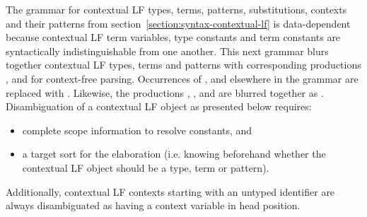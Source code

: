 \documentclass[11pt]{article}
\newcommand{\LF}{\textsc{LF}\xspace}
\begin{document}
The grammar for contextual \LF types, terms, patterns, substitutions, contexts and their patterns from section~\ref{section:syntax-contextual-lf} is data-dependent because contextual \LF term variables, type constants and term constants are syntactically indistinguishable from one another.
This next grammar blurs together contextual \LF types, terms and patterns with corresponding productions ,  and  for context-free parsing.
Occurrences of ,  and  elsewhere in the grammar are replaced with .
Likewise, the productions , ,  and  are blurred together as .
Disambiguation of a contextual \LF object as presented below requires:
\begin{itemize}
\item complete scope information to resolve constants, and
\item a target sort for the elaboration (i.e. knowing beforehand whether the contextual \LF object should be a type, term or pattern).
\end{itemize}
Additionally, contextual \LF contexts starting with an untyped identifier are always disambiguated as having a context variable in head position.
\end{document}
